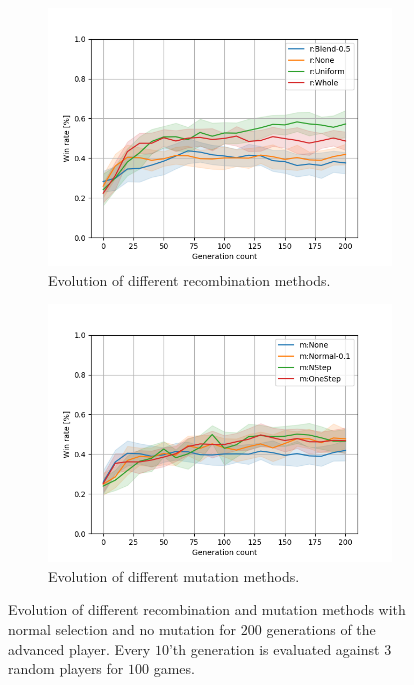 \documentclass{llncs}
\begin{document}
\begin{figure}[t]
    \centering
    \begin{subfigure}[t]{0.49\textwidth}
        \centering
        \captionsetup{width=.9\textwidth}
        \includegraphics[width=\textwidth]{figures/recombination/eval_recombination_methods.png}
        \caption{Evolution of different recombination methods.}
        \label{subfig:recombs_advanced}
    \end{subfigure}
    \begin{subfigure}[t]{0.49\textwidth}
        \centering
        \captionsetup{width=.9\textwidth}
        \includegraphics[width=\textwidth]{figures/mutation/eval_mutation_methods.png}
        \caption{Evolution of different mutation methods.}
        \label{subfig:mutations_advanced}
    \end{subfigure}
    \caption{Evolution of different recombination and mutation methods with normal selection and no mutation for $200$ generations of the advanced player. Every $10$'th generation is evaluated against $3$ random players for $100$ games.}
    \label{fig:recomb_mutation_advanced}
\end{figure}
\end{document}
